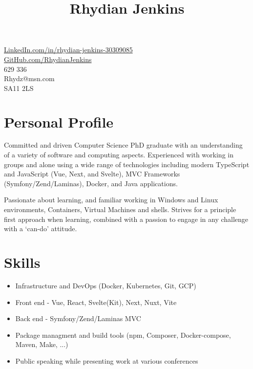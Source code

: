 \documentclass[10pt]{article}
\title{\bfseries\Huge Rhydian Jenkins}
\date{}
\author{}
\begin{document}
\maketitle \vspace{-7em}

\section*{}
\faLinkedin \quad \href{https://www.linkedin.com/in/rhydian-jenkins-30309085/}{LinkedIn.com/in/rhydian-jenkins-30309085}\\
\faGithub \quad \href{https://github.com/RhydianJenkins}{GitHub.com/RhydianJenkins}\\
\faPhone {} 629 336\\
\faEnvelope \quad Rhydz@msn.com\\
\faMapMarker \quad SA11 2LS

\section*{Personal Profile}
\noindent Committed and driven Computer Science PhD graduate with an understanding of a variety of software and computing aspects. Experienced with working in groups and alone using a wide range of technologies including modern TypeScript and JavaScript (Vue, Next, and Svelte), MVC Frameworks (Symfony/Zend/Laminas), Docker, and Java applications.

Passionate about learning, and familiar working in Windows and Linux environments, Containers, Virtual Machines and shells. Strives for a principle first approach when learning, combined with a passion to engage in any challenge with a `can-do' attitude.

\section*{Skills}
\begin{itemize} \setlength\itemsep{-0.25em}
	\item Infrastructure and DevOps (Docker, Kubernetes, Git, GCP)
    \item Front end - Vue, React, Svelte(Kit), Next, Nuxt, Vite
	\item Back end - Symfony/Zend/Laminas MVC
	\item Package managment and build tools (npm, Composer, Docker-compose, Maven, Make, ...)
	\item Public speaking while presenting work at various conferences
\end{itemize}
\end{document}
